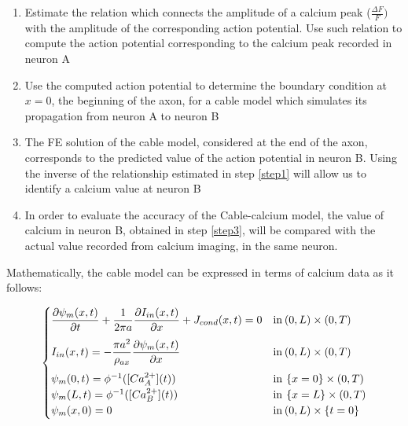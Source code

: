 \documentclass[12pt, a4paper]{report}
\begin{document}
\begin{enumerate}
	
	\item Estimate the relation which connects the amplitude of a calcium peak ($\frac{\Delta F}{F})$ with the amplitude of the corresponding action potential. Use such relation to compute the action potential corresponding to the calcium peak recorded in neuron A \label{step1}
	
	\item Use the computed action potential to determine the boundary condition at $x=0$, the beginning of the axon, for a cable model which simulates its propagation from neuron A to neuron B
	
	\item The FE solution of the cable model, considered at the end of the axon, corresponds to the predicted value of the action potential  in neuron B. Using the inverse of the relationship estimated in step \ref{step1} will allow us to identify a calcium value at neuron B \label{step3}
	
	\item In order to evaluate the accuracy of the Cable-calcium model, the value of calcium in neuron B, obtained in step \ref{step3},  will be compared with the actual value recorded from calcium imaging, in the same neuron.
	
\end{enumerate}


Mathematically, the cable model can be expressed in terms of calcium data as it follows:

\begin{equation}
	\begin{cases} 
	
	\displaystyle \frac{\partial \psi_m(x,t)}{\partial t} + \displaystyle \frac{1}{2 \pi a }\frac{\partial I_{in}(x,t)}{\partial x} + J_{cond}(x,t) = 0 & \text{in} \hspace{0.07 cm} (0,L) \times (0,T) \\[1em]
	I_{in}(x,t) = \displaystyle -\frac{\pi a^2}{\rho_{ax}}\frac{\partial \psi_m(x,t)}{\partial x} & \text{in} \hspace{0.07 cm} (0,L) \times (0,T) \\[1em]
	\psi_m(0,t) = \phi^{-1}([Ca_A^{2+}](t)) & \text{in} \hspace{0.07 cm} \left\{ x = 0\right\} \times (0,T) \\
	\psi_m(L,t) = \phi^{-1}([Ca_B^{2+}](t)) & \text{in} \hspace{0.07 cm} \left\{ x = L\right\} \times (0,T) \\
	\psi_m(x,0)=0  & \text{in} \hspace{0.07 cm}  (0,L) \times \left\{ t = 0\right\}
	
	\end{cases} \label{cable with ca}
\end{equation}	
\end{document}
